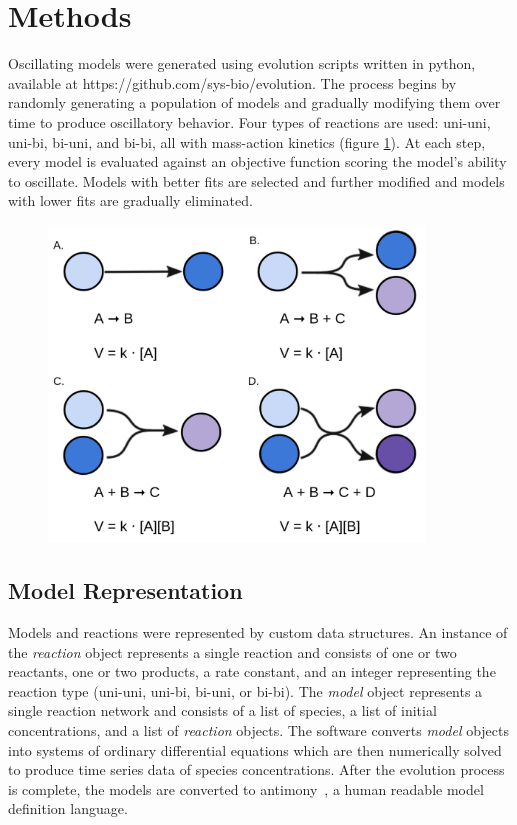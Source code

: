 \documentclass[12pt]{report}
\begin{document}
\section{Methods}



Oscillating models were generated using evolution scripts written in python, available at https://github.com/sys-bio/evolution. The process begins by randomly generating a population of models and gradually modifying them over time to produce oscillatory behavior. Four types of reactions are used: uni-uni, uni-bi, bi-uni, and bi-bi, all with mass-action kinetics (figure \ref{fig:reaction}). At each step, every model is evaluated against an objective function scoring the model's ability to oscillate. Models with better fits are selected and further modified and models with lower fits are gradually eliminated. 
\begin{figure}
    \centering
    \includegraphics[width=10cm]{images/Reactions.png}
    \label{fig:reaction}
    
\end{figure}





\subsection{Model Representation}

Models and reactions were represented by custom data structures. An instance of the \textit{reaction} object represents a single reaction and consists of one or two reactants, one or two products, a rate constant, and an integer representing the reaction type (uni-uni, uni-bi, bi-uni, or bi-bi). The \textit{model} object represents a single reaction network and consists of a list of species, a list of initial concentrations, and a list of \textit{reaction} objects. The software converts \textit{model} objects into systems of ordinary differential equations which are then numerically solved to produce time series data of species concentrations. After the evolution process is complete, the models are converted to antimony~\cite{Smith2009}, a human readable model definition language.
\end{document}
